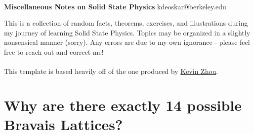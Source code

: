 \documentclass[11pt]{article}
\begin{document}
\thispagestyle{empty}
\bigskip \
\vspace{0.1cm}

\begin{center}
{\fontsize{30}{30} \selectfont \bf \sffamily Miscellaneous Notes on Solid State Physics}
\vskip 6pt
{\fontsize{14}{14} \selectfont \ttfamily kdeoskar@berkeley.edu} 
\vskip 24pt
\end{center}



This is a collection of random facts, theorems, exercises, and illustrations during my journey of learning Solid State Physics. Topics may be organized in a slightly nonsensical manner (sorry). Any errors are due to my own ignorance - please feel free to reach out and correct me!
\\
\\
This template is based heavily off of the one produced by \href{https://knzhou.github.io/}{Kevin Zhou}.

\setcounter{tocdepth}{3}
\tableofcontents 



\newpage
\section{Why are there exactly 14 possible Bravais Lattices?}
\end{document}
